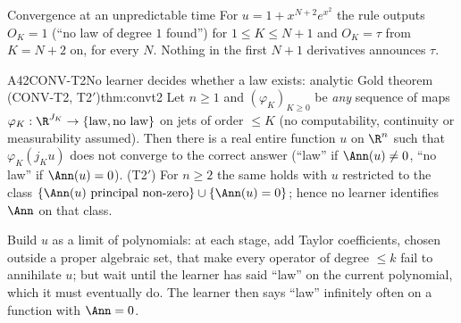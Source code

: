 \begin{example}{Convergence at an unpredictable time}
For $u=1+x^{N+2}e^{x^2}$ the rule outputs $O_K=1$ (``no law of degree $1$ found'') for $1\le K\le N+1$ and $O_K=\tau$ from $K=N+2$ on, for every $N$. Nothing in the first $N+1$ derivatives announces $\tau$.
\end{example}

\begin{dimcard}{A42}{CONV-T2}{No learner decides whether a law exists: analytic Gold theorem (CONV-T2, T2$'$)}{\proved}{thm:convt2}
Let $n\ge1$ and $(\varphi_K)_{K\ge0}$ be \emph{any} sequence of maps $\varphi_K:\R^{J_K}\to\{\text{law},\text{no law}\}$ on jets of order $\le K$ (no computability, continuity or measurability assumed). Then there is a real entire function $u$ on $\R^n$ such that $\varphi_K(j_Ku)$ does not converge to the correct answer (``law'' if $\Ann(u)\ne0$, ``no law'' if $\Ann(u)=0$). (T2$'$) For $n\ge2$ the same holds with $u$ restricted to the class $\{\Ann(u)\text{ principal non-zero}\}\cup\{\Ann(u)=0\}$; hence no learner identifies $\Ann$ on that class.
\end{dimcard}

\begin{proofidea}
Build $u$ as a limit of polynomials: at each stage, add Taylor coefficients, chosen outside a proper algebraic set, that make every operator of degree $\le k$ fail to annihilate $u$; but wait until the learner has said ``law'' on the current polynomial, which it must eventually do. The learner then says ``law'' infinitely often on a function with $\Ann=0$.
\end{proofidea}

